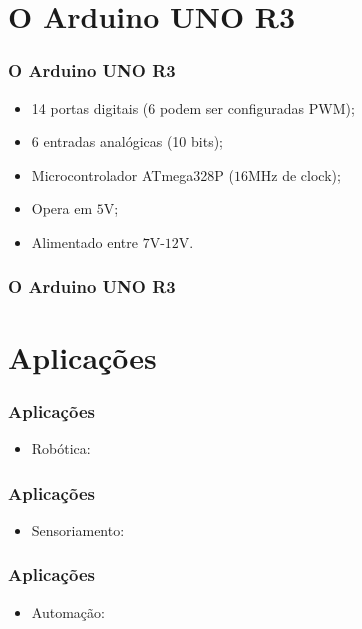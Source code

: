 \documentclass{beamer}
\begin{document}
\section{O Arduino UNO R3}
\begin{frame}
	\frametitle{O Arduino UNO R3}
	\begin{itemize}
		\item 14 portas digitais (6 podem ser configuradas PWM);
		\item 6 entradas analógicas (10 bits);
		\item Microcontrolador ATmega328P ($16$MHz de clock);
		\item Opera em $5$V;
		\item Alimentado entre $7$V-$12$V.
	\end{itemize}
\end{frame}

\begin{frame}
	\frametitle{O Arduino UNO R3}
	\begin{center}
	\end{center}
\end{frame}

\section{Aplicações}
\begin{frame}
	\frametitle{Aplicações}
	\begin{itemize}
	\item Robótica:
	\end{itemize}
	\begin{center}
	\end{center}
\end{frame}
\begin{frame}
	\frametitle{Aplicações}
	\begin{itemize}
	\item Sensoriamento:
	\end{itemize}
	\begin{center}
	\end{center}
\end{frame}
\begin{frame}
	\frametitle{Aplicações}
	\begin{itemize}
	\item Automação:
	\end{itemize}
	\begin{center}
	\end{center}
\end{frame}
\end{document}
